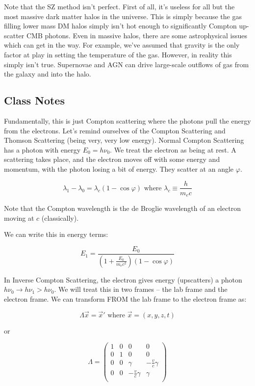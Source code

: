 \documentclass{article}
\begin{document}
Note that the SZ method isn't perfect. First of all, it's useless for all but the most massive dark matter halos in the universe. This is simply because the gas filling lower mass DM halos simply isn't hot enough to significantly Compton up-scatter CMB photons. Even in massive halos, there are some astrophysical issues which can get in the way. For example, we've assumed that gravity is the only factor at play in setting the temperature of the gas. However, in reality this simply isn't true. Supernovae and AGN can drive large-scale outflows of gas from the galaxy and into the halo. 

\subsection{Class Notes}

Fundamentally, this is just Compton scattering where the photons pull the energy from the electrons. Let's remind ourselves of the Compton Scattering and Thomson Scattering (being very, very low energy). Normal Compton Scattering has a photon with energy $E_0 = h\nu_0$. We treat the electron as being at rest. A scattering takes place, and the electron moves off with some energy and momentum, with the photon losing a bit of energy. They scatter at an angle $\varphi$. 

$$
\lambda_1 - \lambda_0 = \lambda_c \left(1-\cos\varphi\right) \text{ where } \lambda_c \equiv \frac{h}{m_e c}
$$

Note that the Compton wavelength is the de Broglie wavelength of an electron moving at $c$ (classically). 

We can write this in energy terms:

$$
E_1 = \frac{E_0}{\left(1 + \frac{E_0}{m_e c^2}\right)\left(1 - \cos\varphi\right)}
$$

In Inverse Compton Scattering, the electron gives energy (upscatters) a photon $h\nu_0 \to h\nu_1 > h\nu_0$. We will treat this in two frames -- the lab frame and the electron frame. We can transform FROM the lab frame to the electron frame as:

$$
\Lambda \vec{x} = \vec{x}' \text{ where } \vec{x} = (x,y,z,t)
$$

or 

\[
\Lambda = 
\begin{pmatrix}
1 & 0 & 0&0\\
0 & 1 & 0&0\\
0 & 0 & \gamma&-\frac{v}{c}\gamma\\
0 & 0 & -\frac{v}{c}\gamma&\gamma\\

\end{pmatrix}
\]
\end{document}

